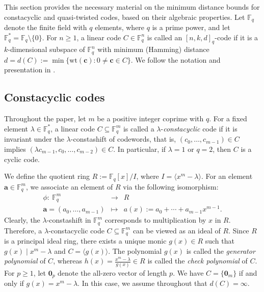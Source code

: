 \documentclass[11pt]{amsart}
\theoremstyle{plain}
\theoremstyle{definition}
\numberwithin{equation}{section}
\newcommand{\Fq}{\mathbb{F}_{q}}
\newcommand{\F}{{\mathbb F}}
\begin{document}
This section provides the necessary material on the minimum distance bounds for constacyclic and quasi-twisted codes, based on their algebraic properties. Let $\Fq$ denote the finite field with $q$ elements, where $q$ is a prime power, and let $\Fq^*=\Fq\setminus \{0\}$. For $n\geq 1$, a linear code $C\in \Fq^n$ is called an $[n,k,d]_q$-code if it is a $k$-dimensional subspace of $\Fq^n$ with minimum (Hamming) distance $d=d(C):=\min\{\mbox{wt}(\mathbf{c}) : 0\neq \mathbf{c}\in C\}$. We follow the notation and presentation in \cite{ELLOT}.

\subsection{Constacyclic codes} \label{consta sect}\hfill

Throughout the paper, let $m$ be a positive integer coprime with $q$. For a fixed element $\lambda \in \Fq^*$, a linear code $C\subseteq \Fq^m$ is called a $\lambda$-{\it constacyclic} code if it is invariant under the $\lambda$-constashift of codewords, that is, $(c_0,\ldots,c_{m-1}) \in C$ implies $(\lambda c_{m-1},c_0,\ldots,c_{m-2}) \in C$. In particular, if $\lambda = 1$ or $q=2$, then $C$ is a cyclic code. 

We define the quotient ring $R:=\Fq[x]/I$, where $I=\langle x^m -\lambda \rangle$. For an element $\mathbf{a}\in \Fq^m$, we associate an element of $R$ via the following isomorphism:
\begin{equation}\begin{array}{rcl} \label{identification-1}
\phi: \ \F_q^{m} & \longrightarrow & R  \\
\mathbf{a}=(a_0,\ldots,a_{m-1}) & \longmapsto & a(x):= a_0+\cdots + a_{m-1}x^{m-1}.
\end{array}
\end{equation}
Clearly, the $\lambda$-constashift in $\F_q^{m}$ corresponds to multiplication by $x$ in $R$. Therefore, a $\lambda$-constacyclic code $C\subseteq \Fq^m$ can be viewed as an ideal of $R$. Since $R$ is a principal ideal ring, there exists a unique monic $g(x)\in R$ such that $g(x)\mid x^m-\lambda$ and $C=\langle g(x)\rangle$. The polynomial $g(x)$ is called the {\it generator polynomial} of $C$, whereas $h(x)=\frac{x^m-\lambda}{g(x)}\in R$ is called the {\it check polynomial} of $C$. For $p\geq 1$, let $\mathbf{0}_p$ denote the all-zero vector of length $p$. We have $C=\{\mathbf{0}_m\}$ if and only if $g(x)=x^m-\lambda$. In this case, we assume throughout that $d(C)=\infty$.
\end{document}
